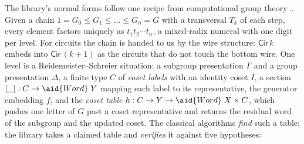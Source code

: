 The library's normal forms follow one recipe from computational group
theory~\cite{sims1994computation,holt2005handbook}.  Given a chain $1 =
G_0 \le G_1 \le \dots \le G_n = G$ with a transversal $T_k$ of each
step, every element factors uniquely as $t_1 t_2 \cdots t_n$, a
mixed-radix numeral with one digit per level.  For circuits the chain is
handed to us by the wire structure: $\mathsf{Cir}\,k$ embeds into
$\mathsf{Cir}\,(k{+}1)$ as the circuits that do not touch the bottom
wire.  One level is a Reidemeister--Schreier situation: a subgroup
presentation $\Gamma$ and a group presentation $\Delta$, a finite type
$C$ of \emph{coset labels} with an identity coset $I$, a section $[\_]
: C \to \aid{Word}\;Y$ mapping each label to its representative, the
generator embedding $f$, and the \emph{coset table} $h : C \to Y \to
\aid{Word}\;X \times C$, which pushes one letter of $G$ past a coset
representative and returns the residual word of the subgroup and the
updated coset.  The classical algorithms \emph{find} such a table; the
library takes a claimed table and \emph{verifies} it against five
hypotheses:

